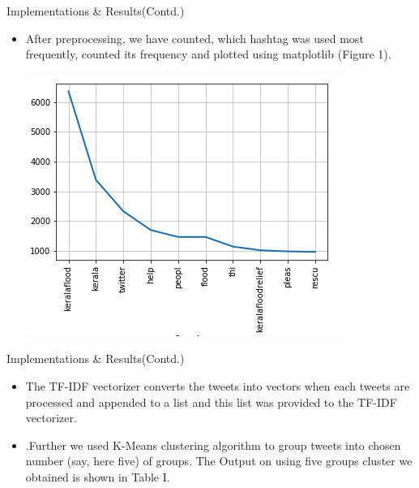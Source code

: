 \documentclass[10pt]{beamer}
\begin{document}
\begin{frame}[fragile]{ Implementations  \& Results(Contd.)}

 \begin{itemize}
\item  After preprocessing, we have counted, which hashtag was
used most frequently, counted its frequency and plotted using
matplotlib (Figure 1).\\
\begin{center}
\includegraphics[scale=0.45]{fig_1.png}
  \end{center}
  
 \end{itemize}
\end{frame}

\begin{frame}[fragile]{ Implementations \& Results(Contd.)}

 \begin{itemize}
\item The TF-IDF vectorizer converts the tweets into
vectors when each tweets are processed and appended to a
list and this list was provided to the TF-IDF vectorizer.
\item .Further we used
K-Means clustering algorithm to group tweets into chosen
number (say, here five) of groups. The Output on using five
groups cluster we obtained is shown in Table I. 





 \end{itemize}
\end{frame}
\end{document}
